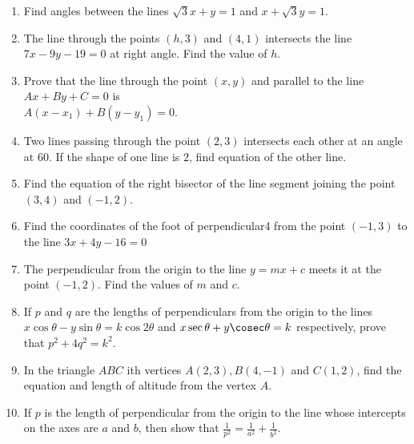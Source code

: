 \begin{enumerate}
\item Find angles between the lines $\sqrt3x+y=1$ and $x+\sqrt3y=1$.
\item The line through the points $(h,3)$ and $(4,1)$ intersects the line $7x-9y-19=0$ at right angle. Find the value of $h$.
\item Prove that the line through the point $(x,y)$ and parallel to the line $Ax+By+C=0$ is
\\ $A(x-x_1)+B(y-y_1)=0$.
\item Two lines passing through the point $(2,3)$ intersects each other at an angle at 60\degree. If the shape of one line is $2$, find equation of the other line.
\item Find the equation of the right bisector of the line segment joining the point $(3,4)$ and $(-1,2)$.
\item Find the coordinates of the foot of perpendicular4 from the point $(-1,3)$ to the line $3x+4y-16=0$
\item The perpendicular from the origin to the line $y=mx+c$ meets it at the point $(-1,2)$. Find the values of $m$ and $c$.
\item If $p$ and $q$ are the lengths of perpendiculars from the origin to the lines $x \cos \theta-y \sin \theta=k \cos 2 \theta$ and $x \sec \theta+y \cosec \theta=k$ respectively, prove that $p^2+4q^2=k^2$.
\item In the triangle $ABC$ ith vertices $A(2,3), B(4,-1)$ and $C(1,2)$, find the equation and length of altitude from the vertex $A$.
\item If $p$ is the length of perpendicular from the origin to the line whose intercepts on the axes are $a$  and $b$, then show that $\frac{1}{p^2}=\frac{1}{a^2}+\frac{1}{b^2}$.
\end{enumerate}
